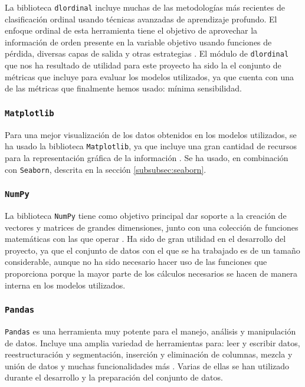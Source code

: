 La biblioteca \texttt{dlordinal} incluye muchas de las metodologías más recientes de clasificación ordinal usando técnicas avanzadas de aprendizaje profundo. El enfoque ordinal de esta herramienta tiene el objetivo de aprovechar la información de orden presente en la variable objetivo usando funciones de pérdida, diversas capas de salida y otras estrategias \cite{dlordinal}. El módulo de \texttt{dlordinal} que nos ha resultado de utilidad para este proyecto ha sido la el conjunto de métricas que incluye para evaluar los modelos utilizados, ya que cuenta con una de las métricas que finalmente hemos usado: mínima sensibilidad.

\subsubsection{\texttt{Matplotlib}}
\label{subsubsec:matplotlib}

Para una mejor visualización de los datos obtenidos en los modelos utilizados, se ha usado la biblioteca \texttt{Matplotlib}, ya que incluye una gran cantidad de recursos para la representación gráfica de la información \cite{matplotlib}. Se ha usado, en combinación con \texttt{Seaborn}, descrita en la sección \ref{subsubsec:seaborn}.

\newpage
\subsubsection{\texttt{NumPy}}
\label{subsubsec:numpy}

La biblioteca \texttt{NumPy} tiene como objetivo principal dar soporte a la creación de vectores y matrices de grandes dimensiones, junto con una colección de funciones matemáticas con las que operar \cite{numpy}. Ha sido de gran utilidad en el desarrollo del proyecto, ya que el conjunto de datos con el que se ha trabajado es de un tamaño considerable, aunque no ha sido necesario hacer uso de las funciones que proporciona porque la mayor parte de los cálculos necesarios se hacen de manera interna en los modelos utilizados.

\subsubsection{\texttt{Pandas}}
\label{subsubsec:pandas}

\texttt{Pandas} es una herramienta muy potente para el manejo, análisis y manipulación de datos. Incluye una amplia variedad de herramientas para: leer y escribir datos, reestructuración y segmentación, inserción y eliminación de columnas, mezcla y unión de datos y muchas funcionalidades más \cite{pandas}. Varias de ellas se han utilizado durante el desarrollo y la preparación del conjunto de datos.

